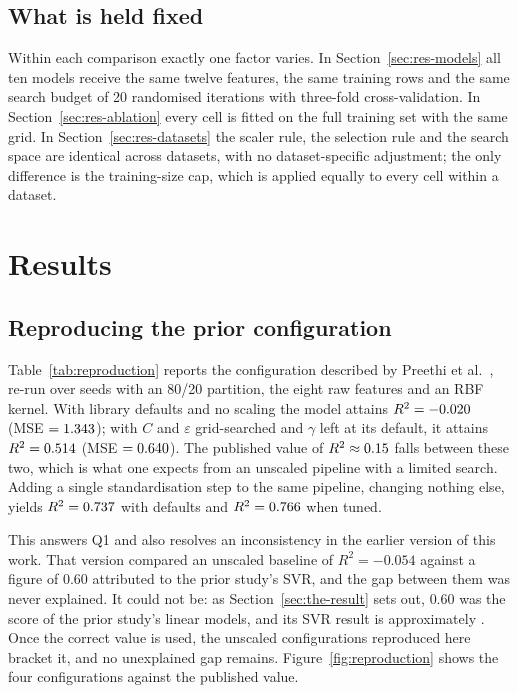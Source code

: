 \documentclass[pdflatex,sn-mathphys-num]{sn-jnl}
\begin{document}
\subsection{What is held fixed}\label{sec:fixed}
Within each comparison exactly one factor varies. In Section~\ref{sec:res-models} all ten models receive the same twelve features, the same training rows and the same search budget of 20 randomised iterations with three-fold cross-validation. In Section~\ref{sec:res-ablation} every cell is fitted on the full training set with the same grid. In Section~\ref{sec:res-datasets} the scaler rule, the selection rule and the search space are identical across datasets, with no dataset-specific adjustment; the only difference is the training-size cap, which is applied equally to every cell within a dataset.

\section{Results}\label{sec:results}

\subsection{Reproducing the prior configuration}\label{sec:res-reproduction}
Table~\ref{tab:reproduction} reports the configuration described by Preethi et al.\ \cite{preethi2025}, re-run over \RepSeeds{} seeds with an 80/20 partition, the eight raw features and an RBF kernel. With library defaults and no scaling the model attains $R^2 = -0.020$ (MSE $= 1.343$); with $C$ and $\varepsilon$ grid-searched and $\gamma$ left at its default, it attains $R^2 = 0.514$ (MSE $= 0.640$). The published value of $R^2 \approx 0.15$ falls between these two, which is what one expects from an unscaled pipeline with a limited search. Adding a single standardisation step to the same pipeline, changing nothing else, yields $R^2 = 0.737$ with defaults and $R^2 = 0.766$ when tuned.

This answers Q1 and also resolves an inconsistency in the earlier version of this work. That version compared an unscaled baseline of $R^2 = -0.054$ against a figure of $0.60$ attributed to the prior study's SVR, and the gap between them was never explained. It could not be: as Section~\ref{sec:the-result} sets out, $0.60$ was the score of the prior study's linear models, and its SVR result is approximately \PreethiReportedRtwo{}. Once the correct value is used, the unscaled configurations reproduced here bracket it, and no unexplained gap remains. Figure~\ref{fig:reproduction} shows the four configurations against the published value.
\end{document}
